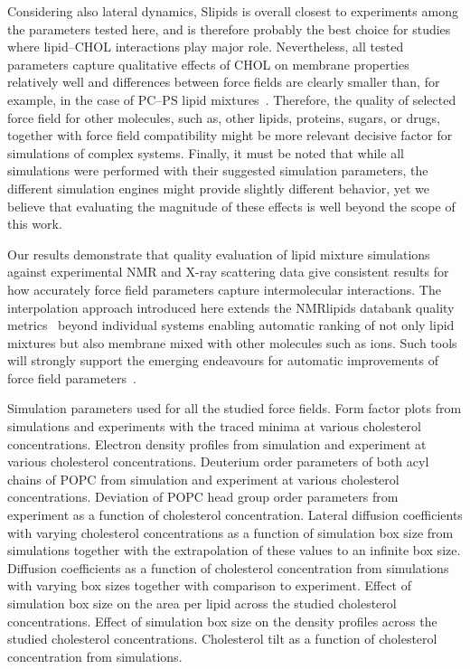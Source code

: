 \documentclass[journal=jctcce]{achemso}
\begin{document}
Considering also lateral dynamics, Slipids is overall closest to experiments among the parameters tested here, and is therefore probably the best choice for studies where lipid--CHOL interactions play major role. Nevertheless, all tested parameters capture qualitative effects of CHOL on membrane properties relatively well and differences between force fields are clearly smaller than, for example, in the case of PC--PS lipid mixtures~\cite{antila2022emerging}. Therefore, the quality of selected force field for other molecules, such as, other lipids, proteins, sugars, or drugs, together with force field compatibility might be more relevant decisive factor for simulations of complex systems. Finally, it must be noted that while all simulations were performed with their suggested simulation parameters, the different simulation engines might provide slightly different behavior, yet we believe that evaluating the magnitude of these effects is well beyond the scope of this work.

Our results demonstrate that quality evaluation of lipid mixture simulations against experimental NMR and X-ray scattering data give consistent results for how accurately force field parameters capture intermolecular interactions. The interpolation approach introduced here extends the NMRlipids databank quality metrics~\cite{NMRlipidsDatabank} beyond individual systems enabling automatic ranking of not only lipid mixtures but also membrane mixed with other molecules such as ions. Such tools will strongly support the emerging endeavours for automatic improvements of force field parameters~\cite{antila2022emerging}.

\begin{suppinfo}
Simulation parameters used for all the studied force fields.
%
Form factor plots from simulations and experiments with the traced minima at various cholesterol concentrations.
%
Electron density profiles from simulation and experiment at various cholesterol concentrations.
%
Deuterium order parameters of both acyl chains of POPC from simulation and experiment at various cholesterol concentrations.
%
Deviation of POPC head group order parameters from experiment as a function of cholesterol concentration.
%
Lateral diffusion coefficients with varying cholesterol concentrations as a function of simulation box size from simulations together with the extrapolation of these values to an infinite box size.
%
Diffusion coefficients as a function of cholesterol concentration from simulations with varying box sizes together with comparison to experiment.
%
Effect of simulation box size on the area per lipid across the studied cholesterol concentrations.
%
Effect of simulation box size on the density profiles across the studied cholesterol concentrations.
%
Cholesterol tilt as a function of cholesterol concentration from simulations.
\end{suppinfo}
\end{document}
